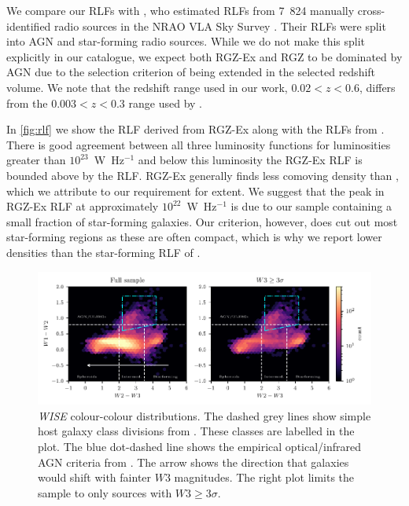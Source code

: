   We compare our RLFs with \citet{mauch07rlf}, who estimated RLFs from 7~824
  manually cross-identified radio sources in the NRAO VLA Sky Survey \citep[NVSS;][]{condon98nvss}.
  Their RLFs were split into AGN and star-forming radio sources. While we
  do not make this split explicitly in our catalogue, we expect both RGZ-Ex
  and RGZ to be dominated by AGN due to the selection criterion of being extended in the selected redshift volume. We note that the redshift range used in our work, $0.02 < z < 0.6$, differs from the $0.003 < z < 0.3$ range used by \citet{mauch07rlf}.

  In \autoref{fig:rlf} we show the RLF derived from RGZ-Ex along with the RLFs from \citet{mauch07rlf}. There is good
  agreement between all three luminosity functions for luminosities greater than $10^{23}$~W~Hz$^{-1}$
  and below this luminosity the RGZ-Ex RLF is bounded above by the
  \citet{mauch07rlf} RLF. RGZ-Ex generally finds less comoving density than \citet{mauch07rlf}, which we attribute to our requirement for extent. We suggest that the peak in RGZ-Ex RLF at approximately $10^{22}$~W~Hz$^{-1}$ is due to our sample containing a small fraction of star-forming galaxies. Our criterion, however, does cut out most star-forming regions as these are often compact, which is why we report lower densities than the star-forming RLF of \citet{mauch07rlf}.

\begin{figure}
    \centering
    \includegraphics[width=\linewidth]{rlf-images/colour-colour.pdf}
    \caption[\emph{WISE} colour-colour distributions.]{\emph{WISE} colour-colour distributions. The dashed grey lines show
      simple host galaxy class divisions from \citet{jarrett17wise}. These
      classes are labelled in the plot. The blue dot-dashed line shows
      the empirical optical/infrared AGN criteria from \citet{jarrett11wise}. The arrow shows the direction that galaxies would shift with fainter $W3$ magnitudes. The right plot limits the sample to only sources with $W3 \geq 3 \sigma$.
      \label{fig:colour-colour}}
  \end{figure}

